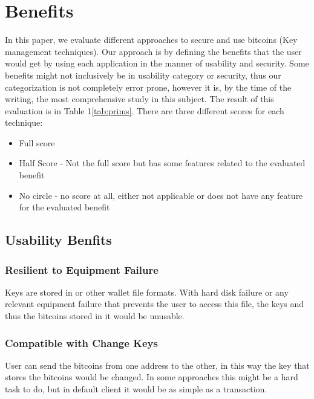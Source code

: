 
\section{Benefits}

In this paper, we evaluate different approaches to secure and use bitcoins (Key management techniques). Our approach is by defining the benefits that the user would get by using each application in the manner of usability and security.
Some benefits might not inclusively be in usability category or security, thus our categorization is not completely error prone, however it is, by the time of the writing, the most comprehensive  study in this subject.
The result of this evaluation is in Table 1\ref{tab:prims}. There are three different scores for each technique:\\

\begin{itemize}
\renewcommand{\labelitemi}{$\bullet$}
\item Full score
\renewcommand{\labelitemi}{$\circ$}
\item Half Score - Not the full score but has some features related to the evaluated benefit
\renewcommand{\labelitemi}{$\textvisiblespace$}
\item No circle - no score at all, either not applicable or does not have any feature for the evaluated benefit
\end{itemize}



\subsection{Usability Benfits}

\subsubsection{Resilient to Equipment Failure}
\label{Resilient to Equipment Failure}
Keys are stored in \walletfile or other wallet file formats. With hard disk failure or any relevant equipment failure that prevents the user to access this file, the keys and thus the bitcoins stored in it would be unusable.

\subsubsection{Compatible with Change Keys}
\label{Compatible with Change Keys}
User can send the bitcoins from one address to the other, in this way the key that stores the bitcoins would be changed. In some approaches this might be a hard task to do, but in default client it would be as simple as a transaction.

